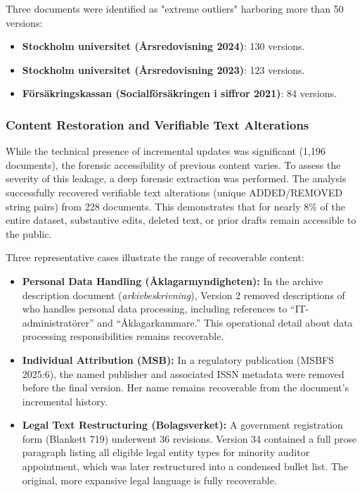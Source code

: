 \documentclass[conference]{IEEEtran}
\begin{document}
Three documents were identified as "extreme outliers" harboring more than 50 versions:
\begin{itemize}
    \item \textbf{Stockholm universitet (Årsredovisning 2024)}: 130 versions.
    \item \textbf{Stockholm universitet (Årsredovisning 2023)}: 123 versions.
    \item \textbf{Försäkringskassan (Socialförsäkringen i siffror 2021)}: 84 versions.
\end{itemize}



\subsubsection{Content Restoration and Verifiable Text Alterations}
While the technical presence of incremental updates was significant (1,196 documents), the forensic accessibility of previous content varies. To assess the severity of this leakage, a deep forensic extraction was performed. The analysis successfully recovered verifiable text alterations (unique ADDED/REMOVED string pairs) from 228 documents. This demonstrates that for nearly 8\% of the entire dataset, substantive edits, deleted text, or prior drafts remain accessible to the public.

Three representative cases illustrate the range of recoverable content:

\begin{itemize}
    \item \textbf{Personal Data Handling (\AA{}klagarmyndigheten):} In the archive description document (\textit{arkivbeskrivning}), Version 2 removed descriptions of who handles personal data processing, including references to ``IT-administrat\"orer'' and ``\AA{}klagarkammare.'' This operational detail about data processing responsibilities remains recoverable.
    \item \textbf{Individual Attribution (MSB):} In a regulatory publication (MSBFS 2025:6), the named publisher and associated ISSN metadata were removed before the final version. Her name remains recoverable from the document's incremental history.
    \item \textbf{Legal Text Restructuring (Bolagsverket):} A government registration form (Blankett 719) underwent 36 revisions. Version 34 contained a full prose paragraph listing all eligible legal entity types for minority auditor appointment, which was later restructured into a condensed bullet list. The original, more expansive legal language is fully recoverable.
\end{itemize}
\end{document}
